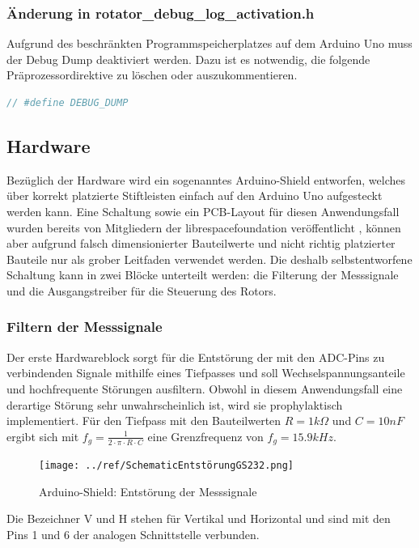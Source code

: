 \subsubsection{Änderung in rotator\_debug\_log\_activation.h}
Aufgrund des beschränkten Programmspeicherplatzes auf dem Arduino Uno muss der Debug Dump deaktiviert werden. Dazu ist es notwendig, die folgende Präprozessordirektive zu löschen oder auszukommentieren.
\begin{lstlisting}[language=C++]
// #define DEBUG_DUMP
\end{lstlisting}

\subsection{Hardware}
\label{subsec:hardware}
Bezüglich der Hardware wird ein sogenanntes Arduino-Shield entworfen, welches über korrekt platzierte Stiftleisten einfach auf den Arduino Uno aufgesteckt werden kann. Eine Schaltung sowie ein PCB-Layout für diesen Anwendungsfall wurden bereits von Mitgliedern der \glqq librespacefoundation\grqq{}  veröffentlicht \cite{noauthor_librespacefoundation_nodate}, können aber aufgrund falsch dimensionierter Bauteilwerte und nicht richtig platzierter Bauteile nur als grober Leitfaden verwendet werden. Die deshalb selbstentworfene Schaltung kann in zwei Blöcke unterteilt werden: die Filterung der Messsignale und die Ausgangstreiber für die Steuerung des Rotors.  

\subsubsection{Filtern der Messsignale}
Der erste Hardwareblock sorgt für die Entstörung der mit den ADC-Pins zu verbindenden Signale mithilfe eines Tiefpasses und soll Wechselspannungsanteile und hochfrequente Störungen ausfiltern. Obwohl in diesem Anwendungsfall eine derartige Störung sehr unwahrscheinlich ist, wird sie prophylaktisch implementiert. Für den Tiefpass mit den Bauteilwerten $R=1k\Omega $ und $C=10nF$ ergibt sich mit ${f}_{g}=\frac{1}{2\cdot \pi \cdot R\cdot C}$ eine Grenzfrequenz von ${f}_{g}=15.9kHz$.

\begin{figure}[H]
	\centering
	\texttt{[image: ../ref/SchematicEntstörungGS232.png]}
	\label{fig:Schaltung_Entstörung_Arduino-Shield}
	\caption{Arduino-Shield: Entstörung der Messsignale}
\end{figure}

Die Bezeichner V und H stehen für Vertikal und Horizontal und sind mit den Pins 1 und 6 der analogen Schnittstelle verbunden.


